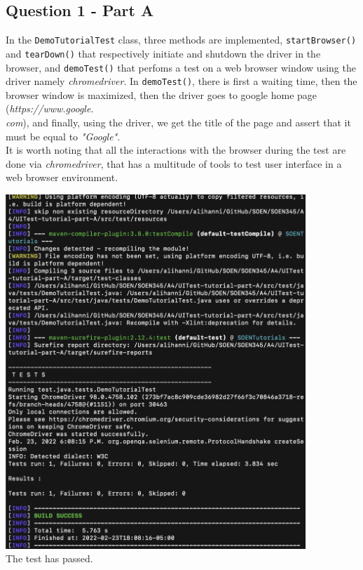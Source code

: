 \newpage
\subsection*{Question 1 -  Part A}

\noindent In the \verb|DemoTutorialTest| class, three methods are implemented, \verb|startBrowser()| and \verb|tearDown()| that respectively initiate and shutdown the driver in the browser, and \verb|demoTest()| that perfoms a test on a web browser window using the driver namely \textit{chromedriver}. In \verb|demoTest()|, there is first a waiting time, then the browser window is maximized, then the driver goes to google home page (\textit{https://www.google.\\com}), and finally, using the driver, we get the title of the page and assert that it must be equal to \textit{"Google"}.\\ It is worth noting that all the interactions with the browser during the test are done via \textit{chromedriver}, that has a multitude of tools to test user interface in a web browser environment. 

\begin{center}
        \includegraphics[width=0.85\textwidth]{img/partA.png}
        \noindent  \\The test has passed.
\end{center}
